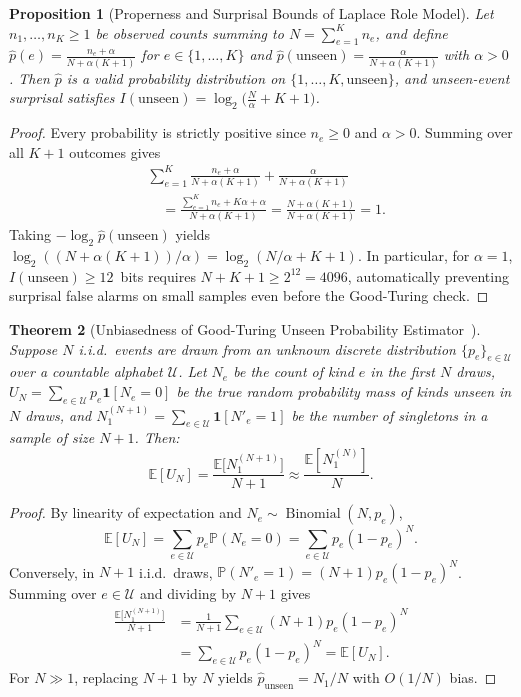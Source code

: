 \documentclass[10pt,twocolumn,letterpaper]{article}
\makeatletter
\theoremstyle{plain}
\newtheorem{theorem}{Theorem}[section]
\newtheorem{proposition}[theorem]{Proposition}
\theoremstyle{definition}
\theoremstyle{remark}
\DeclareRobustCommand{\_}{\ifmmode\nfss@text{\textunderscore}\else\textunderscore\penalty\@highpenalty\hskip\z@skip\fi}
\makeatother
\begin{document}
\begin{proposition}[Properness and Surprisal Bounds of Laplace Role Model]
Let $n_1, \dots, n_K \ge 1$ be observed counts summing to $N = \sum_{e=1}^{K} n_e$, and define $\hat{p}(e) = \frac{n_e + \alpha}{N + \alpha(K + 1)}$ for $e \in \{1, \dots, K\}$ and $\hat{p}(\text{unseen}) = \frac{\alpha}{N + \alpha(K + 1)}$ with $\alpha > 0$. Then $\hat{p}$ is a valid probability distribution on $\{1, \dots, K, \text{unseen}\}$, and unseen-event surprisal satisfies $I(\text{unseen}) = \log_2\!\big(\frac{N}{\alpha} + K + 1\big)$.
\end{proposition}
\begin{proof}
Every probability is strictly positive since $n_e \ge 0$ and $\alpha > 0$. Summing over all $K + 1$ outcomes gives
\begin{align*}
  &\sum_{e=1}^{K} \frac{n_e + \alpha}{N + \alpha(K + 1)} + \frac{\alpha}{N + \alpha(K + 1)}\\
  &\quad = \frac{\sum_{e=1}^{K} n_e + K\alpha + \alpha}{N + \alpha(K + 1)} = \frac{N + \alpha(K + 1)}{N + \alpha(K + 1)} = 1.
\end{align*}
Taking $-\log_2 \hat{p}(\text{unseen})$ yields $\log_2((N + \alpha(K+1))/\alpha) = \log_2(N/\alpha + K + 1)$. In particular, for $\alpha = 1$, $I(\text{unseen}) \ge 12$~bits requires $N + K + 1 \ge 2^{12} = 4096$, automatically preventing surprisal false alarms on small samples even before the Good-Turing check.
\end{proof}

\begin{theorem}[Unbiasedness of Good-Turing Unseen Probability Estimator~\cite{good1953population}]
\label{thm:goodturing}
Suppose $N$ i.i.d.\ events are drawn from an unknown discrete distribution $\{p_e\}_{e \in \mathcal{U}}$ over a countable alphabet $\mathcal{U}$. Let $N_e$ be the count of kind $e$ in the first $N$ draws, $U_N = \sum_{e \in \mathcal{U}} p_e \mathbf{1}[N_e = 0]$ be the true random probability mass of kinds unseen in $N$ draws, and $N_1^{(N+1)} = \sum_{e \in \mathcal{U}} \mathbf{1}[N'_e = 1]$ be the number of singletons in a sample of size $N + 1$. Then:
\[
  \mathbb{E}[U_N] = \frac{\mathbb{E}\big[N_1^{(N+1)}\big]}{N + 1} \approx \frac{\mathbb{E}[N_1^{(N)}]}{N}.
\]
\end{theorem}
\begin{proof}
By linearity of expectation and $N_e \sim \operatorname{Binomial}(N, p_e)$,
\[
  \mathbb{E}[U_N] = \sum_{e \in \mathcal{U}} p_e \mathbb{P}(N_e = 0) = \sum_{e \in \mathcal{U}} p_e (1 - p_e)^N.
\]
Conversely, in $N + 1$ i.i.d.\ draws, $\mathbb{P}(N'_e = 1) = (N + 1) p_e (1 - p_e)^N$. Summing over $e \in \mathcal{U}$ and dividing by $N + 1$ gives
\begin{align*}
  \frac{\mathbb{E}\big[N_1^{(N+1)}\big]}{N + 1} &= \frac{1}{N + 1}\sum_{e \in \mathcal{U}} (N + 1) p_e (1 - p_e)^N\\
  &= \sum_{e \in \mathcal{U}} p_e (1 - p_e)^N = \mathbb{E}[U_N].
\end{align*}
For $N \gg 1$, replacing $N+1$ by $N$ yields $\hat{p}_{\text{unseen}} = N_1 / N$ with $O(1/N)$ bias.
\end{proof}
\end{document}
